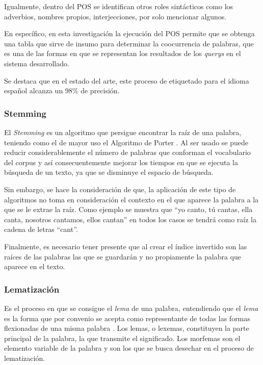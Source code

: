 \documentclass[
  12pt,
  openany]{book}
\begin{document}
Igualmente, dentro del POS se identifican otros roles sintácticos como los adverbios, nombres propios, interjecciones, por solo mencionar algunos.

En específico, en esta investigación la ejecución del POS permite que se obtenga una tabla que sirve de insumo para determinar la coocurrencia de palabras, que es una de las formas en que se representan los resultados de los \emph{querys} en el sistema desarrollado.

Se destaca que en el estado del arte, este proceso de etiquetado para el idioma español alcanza un 98\% de precisión.

\hypertarget{steaming}{%
\subsubsection{Stemming}\label{steaming}}

El \emph{Stemming} es un algoritmo que persigue encontrar la raíz de una palabra, teniendo como el de mayor uso el Algoritmo de Porter \citep{willett2006}. Al ser usado se puede reducir considerablemente el número de palabras que conforman el vocabulario del corpus y así consecuentemente mejorar los tiempos en que se ejecuta la búsqueda de un texto, ya que se disminuye el espacio de búsqueda.



Sin embargo, se hace la consideración de que, la aplicación de este tipo de algoritmos no toma en consideración el contexto en el que aparece la palabra a la que se le extrae la raíz. Como ejemplo se muestra que ``yo canto, tú cantas, ella canta, nosotros cantamos, ellos cantan'' en todos los casos se tendrá como raíz la cadena de letras ``cant''.

Finalmente, es necesario tener presente que al crear el índice invertido son las raíces de las palabras las que se guardarán y no propiamente la palabra que aparece en el texto.

\hypertarget{lemma}{%
\subsubsection{Lematización}\label{lemma}}

Es el proceso en que se consigue el \emph{lema} de una palabra, entendiendo que el \emph{lema} es la forma que por convenio se acepta como representante de todas las formas flexionadas de una misma palabra \citep{demarneffe2021}. Los lemas, o lexemas, constituyen la parte principal de la palabra, la que transmite el significado. Los morfemas son el elemento variable de la palabra y son los que se busca desechar en el proceso de lematización.
\end{document}
